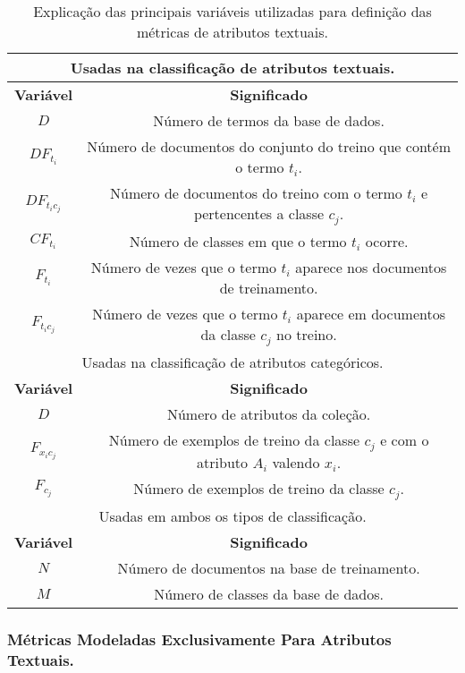 \begin{table}[ht*]
\centering
\caption{Explicação das principais variáveis utilizadas para definição das métricas de atributos textuais.}
\label{table::metricas_attr}
\begin{tabular}{|c|c|}

\toprule
\multicolumn{2}{c}{Usadas na classificação de atributos textuais. }\tabularnewline
\midrule

\toprule
\textbf{Variável} & \textbf{Significado} \\
\midrule
    $D$           & Número de termos da base de dados. \tabularnewline \hline
    $DF_{t_i} $   & Número de documentos do conjunto do treino que contém o termo $t_i$. \tabularnewline \hline
    $DF_{t_ic_j}$ & Número de documentos do treino com o termo $t_i$ e pertencentes a classe $c_j$. \tabularnewline \hline
    $CF_{t_i}$    & Número de classes em que o termo $t_i$ ocorre. \tabularnewline \hline 
    $F_{t_i}$     & Número de vezes que o termo $t_i$ aparece nos documentos de treinamento. \tabularnewline \hline
    $F_{t_ic_j}$  & Número de vezes que o termo $t_i$ aparece em documentos da classe $c_j$ no treino. \tabularnewline
\bottomrule

\midrule
\multicolumn{2}{c}{Usadas na classificação de atributos categóricos. }\tabularnewline
\midrule

\toprule
\textbf{Variável} & \textbf{Significado} \\
\midrule
    $D$           & Número de atributos da coleção. \tabularnewline \hline
    $F_{x_ic_j}$  & Número de exemplos de treino da classe $c_j$ e com o atributo $A_i$ valendo $x_i$. \tabularnewline \hline
    $F_{c_j}$     & Número de exemplos de treino da classe $c_j$. \tabularnewline 
\bottomrule

\midrule
\multicolumn{2}{c}{Usadas em ambos os tipos de classificação. }\tabularnewline
\midrule

\toprule
\textbf{Variável} & \textbf{Significado} \\
\midrule
    $N$           & Número de documentos na base de treinamento. \tabularnewline \hline
    $M$           & Número de classes da base de dados. \tabularnewline
\bottomrule

\end{tabular}
\end{table}

\subsubsection{Métricas Modeladas Exclusivamente Para Atributos Textuais.}
\label{subsec::pg_metricas_conteudo_textual}

